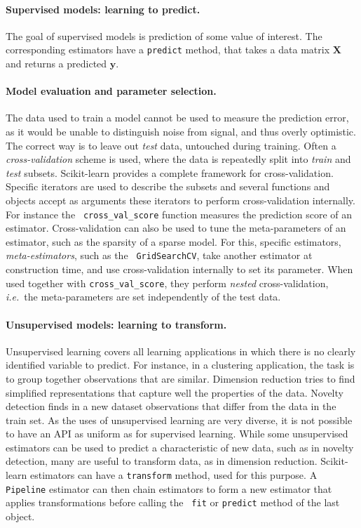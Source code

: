 \documentclass[a4paper]{article}
\begin{document}
\paragraph{Supervised models: learning to predict.}
%
The goal of supervised models is prediction of some value of interest.
The corresponding estimators
have a {\tt predict} method, that takes a data matrix $\mathbf{X}$ and
returns a predicted $\mathbf{y}$.

\paragraph{Model evaluation and parameter selection.}
%
The data used to train a model cannot be used to measure the prediction
error, as it would be unable to distinguish noise from signal, and thus
overly optimistic. The correct way is to leave out \emph{test} data,
untouched during training. Often a \emph{cross-validation} scheme is
used, where the data is repeatedly split into \emph{train} and
\emph{test} subsets. Scikit-learn provides a complete framework for
cross-validation. Specific iterators are used to describe the subsets and
several functions and objects accept as arguments these iterators to
perform cross-validation internally. For instance the {\tt
cross\_val\_score} function measures the prediction score of an
estimator. Cross-validation can also be used to tune the meta-parameters
of an estimator, such as the sparsity of a sparse model. For this,
specific estimators, \emph{meta-estimators}, such as the {\tt
GridSearchCV}, take another estimator at construction time, and use
cross-validation internally to set its parameter. When used together with
{\tt cross\_val\_score}, they perform \emph{nested} cross-validation,
\emph{i.e.}~the meta-parameters are set independently of the test data.

\paragraph{Unsupervised models: learning to transform.}
%
Unsupervised learning covers all learning applications in which there is
no clearly identified variable to predict. For instance, in a clustering
application, the task is to group together observations that are similar.
Dimension reduction tries to find simplified representations that capture
well the properties of the data. Novelty detection finds in a new dataset
observations that differ from the data in the train set. As the uses of
unsupervised learning are very diverse, it is not possible to have an API
as uniform as for supervised learning. While some unsupervised
estimators can be used to predict a characteristic of new data, such as
in novelty detection, many are useful to transform data, as in dimension
reduction. Scikit-learn estimators can have a {\tt transform} method, used
for this purpose. A {\tt Pipeline} estimator can then chain estimators to
form a new estimator that applies transformations before calling the {\tt
fit} or {\tt predict} method of the last object.
\end{document}
